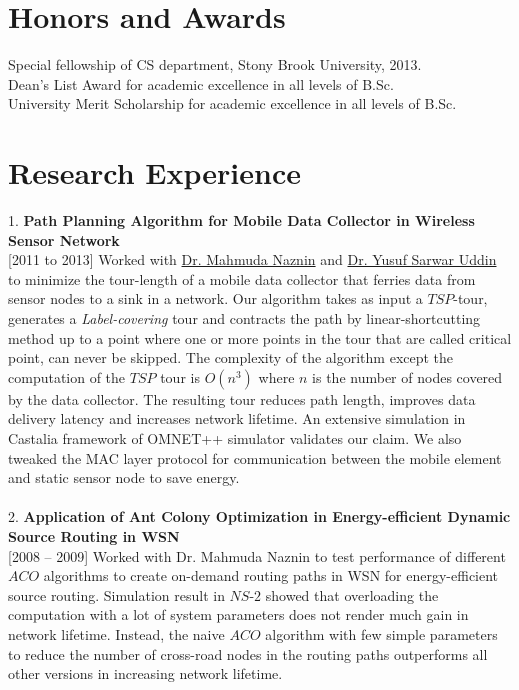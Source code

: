 \documentclass[margin,line,pifont,palatino,courier]{res}
\begin{document}
\begin{resume}
\section{\sc Honors and Awards}
\textbullet{} Special fellowship of CS department, Stony Brook
University, 2013.
\\
\textbullet{ } Dean's List Award for academic excellence in all levels of
B.Sc.
\\
\textbullet{ } University Merit Scholarship for academic excellence in all
levels of B.Sc. \\

\section{\sc Research Experience}
1. \textbf{Path Planning Algorithm for Mobile Data Collector in Wireless
Sensor Network}\\ {[}2011 to 2013{]} 
Worked with
\href{http://www.buet.ac.bd/cse/faculty/facdetail.php?id=mahmudanaznin}{Dr.
Mahmuda Naznin} and
\href{http://www.buet.ac.bd/cse/faculty/facdetail.php?id=yusufsarwar}{Dr. Yusuf Sarwar Uddin} to minimize the tour-length of a mobile data collector that ferries data from sensor nodes to a sink in a network. Our algorithm takes as input a $TSP$-tour, generates a \textit{Label-covering} tour and contracts the path by linear-shortcutting
method up to a point where one or more points in the tour that are called critical point, can
never be skipped. The complexity of the algorithm except the computation of the $TSP$ tour is
$O(n^3)$ where $n$ is the number of nodes covered by the data collector. The resulting tour
reduces path length, improves
data delivery latency and increases network lifetime. An extensive simulation in Castalia framework
of OMNET++ simulator validates our claim. We also tweaked the MAC layer protocol for communication
between the mobile element and static sensor node to save energy.\\ \\
2. \textbf{Application of Ant Colony Optimization in Energy-efficient Dynamic Source Routing in 
WSN}\\ 
{[}2008 -- 2009{]} Worked with Dr. Mahmuda Naznin to test performance of different $ACO$ algorithms
to create on-demand routing paths in WSN for energy-efficient source routing. Simulation result in
$NS$-$2$ showed that overloading the computation with a lot of system parameters does not render
much gain in network lifetime.
Instead, the naive $ACO$ algorithm with few simple parameters to reduce the number 
of cross-road nodes in the routing paths outperforms all other versions in increasing network
lifetime.

\end{resume}
\end{document}
